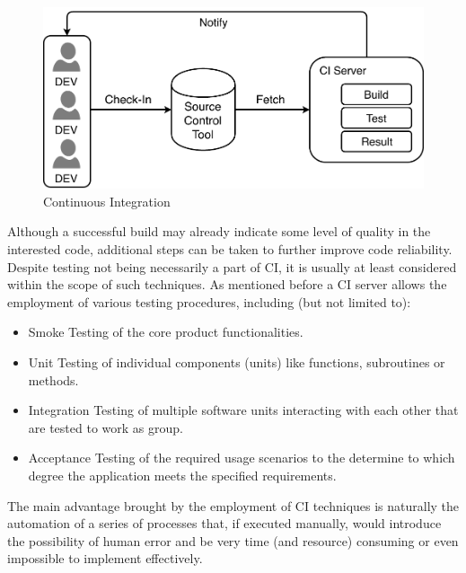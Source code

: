 \begin{figure}[ht]
	\centering
	\includegraphics[scale=0.7]{Images/CI.pdf}
	\caption{Continuous Integration}
	\label{fig:CI}
\end{figure}

Although a successful build may already indicate some level of quality in the interested code, additional steps can be taken to further improve code reliability. Despite testing not being necessarily a part of CI, it is usually at least considered within the scope of such techniques. As mentioned before a CI server allows the employment of various testing procedures, including (but not limited to):

\begin{itemize}
    \item Smoke Testing of the core product functionalities.
    \item Unit Testing of individual components (units) like functions, subroutines or methods. 
    \item Integration Testing of multiple software units interacting with each other that are tested to work as group.
    \item Acceptance Testing of the required usage scenarios to the determine to which degree the application meets the specified requirements.
\end{itemize}

The main advantage brought by the employment of CI techniques is naturally the automation of a series of processes that, if executed manually, would introduce the possibility of human error and be very time (and resource) consuming or even impossible to implement effectively. 